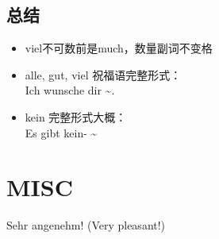 \subsection{总结}
\begin{itemize}
    \item viel不可数前是much，数量副词不变格
    \item alle, gut, viel 祝福语完整形式： \\
    Ich wunsche dir \textasciitilde.
    \item kein 完整形式大概：\\
    Es gibt kein- \textasciitilde
\end{itemize}

\restoregeometry

\section{MISC}

Sehr angenehm! (Very pleasant!)